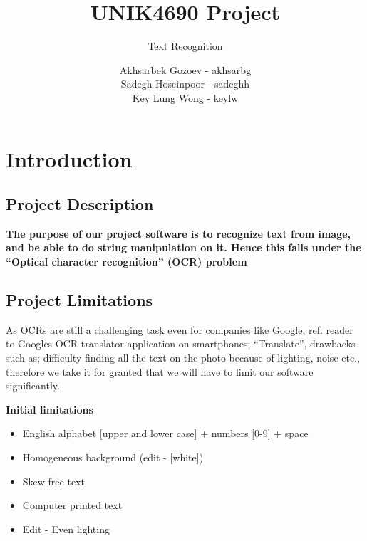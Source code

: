 \documentclass[11pt,a4paper,UKenglish]{article}
\title{UNIK4690 Project}
\subtitle{Text Recognition}
\author{
  Akhsarbek Gozoev  - akhsarbg \\
  Sadegh Hoseinpoor - sadeghh\\
  Key Lung Wong - keylw
}
\begin{document}
\ififorside[kind={Report}]

\newpage
\tableofcontents
\newpage

\section{Introduction}
\label{sec:Introduction}
\subsection{Project Description}
\textbf{The purpose of our project software is to recognize text from image,
and be able to do string manipulation on it. Hence this falls under the
``Optical character recognition'' (OCR) problem}

\subsection{Project Limitations}
As OCRs are still a challenging task even for companies like
Google, ref. reader to Googles OCR translator application on smartphones;
``Translate'', drawbacks such as; difficulty finding all the text on the photo
because of lighting, noise etc., therefore we take it for granted that we will
have to limit our software significantly.

\begin{flushleft}
  \textbf{Initial limitations}
  \begin{itemize}
    \item{English alphabet [upper and lower case] + numbers [0-9] + space}
    \item{Homogeneous background (edit - [white])}
    \item{Skew free text}
    \item{Computer printed text}
    \item{Edit - Even lighting}
  \end{itemize}
\end{flushleft}
\end{document}
